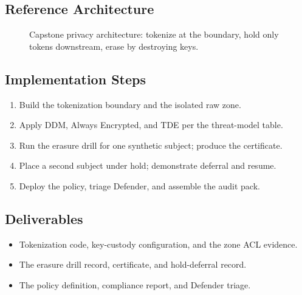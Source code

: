 \subsection*{Reference Architecture}
\begin{figure}[H]
    \centering
    \caption{Capstone privacy architecture: tokenize at the boundary, hold only tokens downstream, erase by destroying keys.}
    \label{fig:ch23-capstone-arch}
\end{figure}

\subsection*{Implementation Steps}
\begin{enumerate}
    \item Build the tokenization boundary and the isolated raw zone.
    \item Apply DDM, Always Encrypted, and TDE per the threat-model table.
    \item Run the erasure drill for one synthetic subject; produce the certificate.
    \item Place a second subject under hold; demonstrate deferral and resume.
    \item Deploy the policy, triage Defender, and assemble the audit pack.
\end{enumerate}

\subsection*{Deliverables}
\begin{itemize}
    \item Tokenization code, key-custody configuration, and the zone ACL evidence.
    \item The erasure drill record, certificate, and hold-deferral record.
    \item The policy definition, compliance report, and Defender triage.
\end{itemize}

